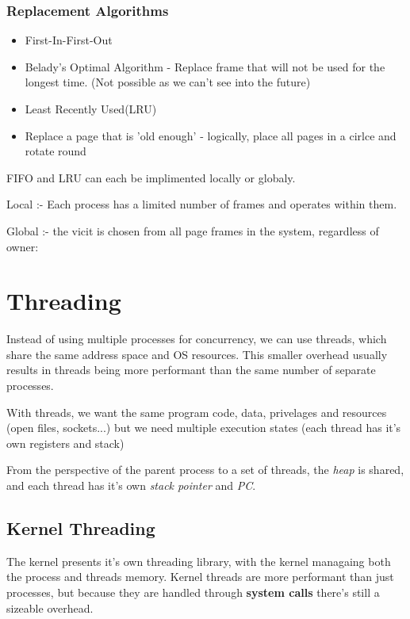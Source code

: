 \documentclass{article}
\begin{document}
\subsubsection{Replacement Algorithms}
\begin{itemize}
    \item First-In-First-Out
    \item Belady's Optimal Algorithm - Replace frame that will not be used for the longest time.
        (Not possible as we can't see into the future)
    \item Least Recently Used(LRU)
    \item Replace a page that is 'old enough' - logically, place all pages in a cirlce and rotate round

\end{itemize}

\vspace{0.5cm}

FIFO and LRU can each be implimented locally or globaly.

Local :- Each process has a limited number of frames and operates within them.

Global :- the vicit is chosen from all page frames in the system, regardless of owner:


\filbreak
\section{Threading}

Instead of using multiple processes for concurrency, we can use threads, which share the same address
space and OS resources. This smaller overhead usually results in threads being more performant than
the same number of separate processes.

With threads, we want the same program code, data, privelages and resources (open files, sockets...) but
we need multiple execution states (each thread has it's own registers and stack)

From the perspective of the parent process to a set of threads, the \emph{heap} is shared, and each thread has
it's own \emph{stack pointer} and \emph{PC}.

\subsection{Kernel Threading}

The kernel presents it's own threading library, with the kernel managaing both the process and threads memory.
Kernel threads are more performant than just processes, but because they are handled through \textbf{system calls}
there's still a sizeable overhead.
\end{document}
